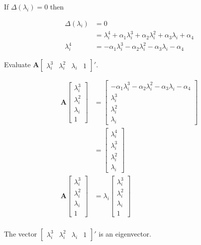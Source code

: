 If $\Delta(\lambda_i)= 0$ then

\begin{align*}
 \Delta (\lambda_i) &= 0\\
 &= \lambda_i^4 + \alpha_1 \lambda_i^3 + \alpha_2 \lambda_i^2 + \alpha_3 \lambda_i + \alpha_4\\
 \lambda_i^4 &=- \alpha_1 \lambda_i^3 - \alpha_2 \lambda_i^2 - \alpha_3 \lambda_i - \alpha_4
\end{align*}

Evaluate $\mathbf{A}\begin{bmatrix}
                     \lambda_i^3 & \lambda_i^2 & \lambda_i & 1
                    \end{bmatrix}'
$.

\begin{align*}
 \mathbf{A}\begin{bmatrix}
                     \lambda_i^3 \\ \lambda_i^2 \\ \lambda_i \\ 1
                    \end{bmatrix} &=
                    \begin{bmatrix}
                     - \alpha_1 \lambda_i^3 - \alpha_2 \lambda_i^2 - \alpha_3 \lambda_i - \alpha_4\\
                     \lambda_i^3 \\ \lambda_i^2 \\ \lambda_i
                    \end{bmatrix}\\
                    &= \begin{bmatrix}
                     \lambda_i^4\\
                     \lambda_i^3 \\ \lambda_i^2 \\ \lambda_i
                    \end{bmatrix}\\
                    \mathbf{A}\begin{bmatrix}
                     \lambda_i^3 \\ \lambda_i^2 \\ \lambda_i \\ 1
                    \end{bmatrix}&=\lambda_i \begin{bmatrix}
                     \lambda_i^3\\
                     \lambda_i^2 \\ \lambda_i \\ 1
                    \end{bmatrix}\\
\end{align*}

The vector $\begin{bmatrix}
                     \lambda_i^3 & \lambda_i^2 & \lambda_i & 1
                    \end{bmatrix}'
$ is an eigenvector.
